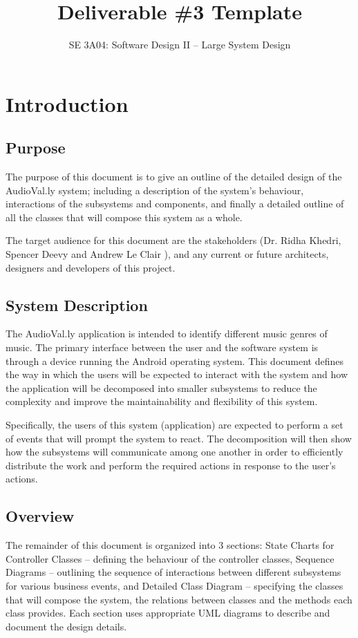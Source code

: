 \documentclass[]{article}
\title{Deliverable \#3 Template}
\author{SE 3A04: Software Design II -- Large System Design}
\date{}
\begin{document}
\newpage
\maketitle	
\tableofcontents
\newpage
\section{Introduction}
\label{sec:introduction}


\subsection{Purpose}
\label{sub:purpose}

The purpose of this document is to give an outline of the detailed design of the AudioVal.ly system; including a description of the system's behaviour, interactions of the subsystems and components, and finally a detailed outline of all the classes that will compose this system as a whole.

The target audience for this document are the stakeholders (Dr. Ridha Khedri, Spencer Deevy and Andrew Le Clair ), and any current or future architects, designers and developers of this project.

\subsection{System Description}
\label{sub:system_description}

The AudioVal.ly application is intended to identify different music genres of music. The primary interface between the user and the software system is through a device running the Android
operating system. This document defines the way in which the users will be expected to interact with the system and how the application will be decomposed into smaller subsystems to reduce the complexity and improve the maintainability and flexibility of this system.

Specifically, the users of this system (application) are expected to perform a set of events that will prompt the system to react. The decomposition will then show how the subsystems will communicate among one another in order to efficiently distribute the work and perform the required actions in response to the user's actions.


\subsection{Overview}
\label{sub:overview}
The remainder of this document is organized into 3 sections: State Charts for Controller Classes -- defining the behaviour of the controller classes, Sequence Diagrams -- outlining the sequence of interactions between different subsystems for various business events, and Detailed Class Diagram -- specifying the classes that will compose the system, the relations between
classes and the methods each class provides. Each section uses appropriate UML diagrams to describe and document the design details.
\end{document}

